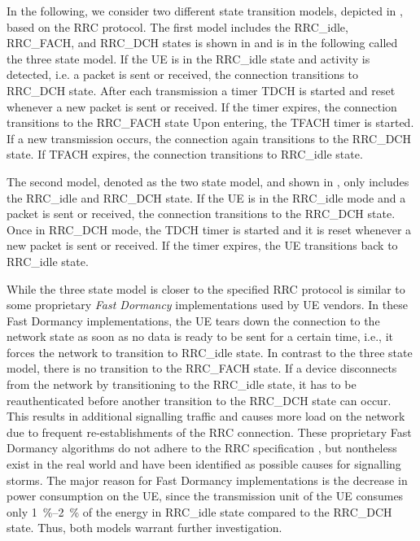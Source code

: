 In the following, we consider two different state transition models, depicted in , based on the \gls{RRC} protocol.
The first model includes the \gls{RRC_idle}, \gls{RRC_FACH}, and \gls{RRC_DCH} states is shown in  and is in the following called the three state model.
If the \gls{UE} is in the \gls{RRC_idle} state and activity is detected, i.e. a packet is sent or received, the connection transitions to \gls{RRC_DCH} state.
After each transmission a timer \gls{TDCH} is started and reset whenever a new packet is sent or received.
If the timer expires, the connection transitions to the \gls{RRC_FACH} state
Upon entering, the \gls{TFACH} timer is started.
If a new transmission occurs, the connection again transitions to the \gls{RRC_DCH} state.
If \gls{TFACH} expires, the connection transitions to \gls{RRC_idle} state.

The second model, denoted as the two state model, and shown in , only includes the \gls{RRC_idle} and \gls{RRC_DCH} state.
If the \gls{UE} is in the \gls{RRC_idle} mode and a packet is sent or received, the connection transitions to the \gls{RRC_DCH} state. Once in \gls{RRC_DCH} mode, the \gls{TDCH} timer is started and it is reset whenever a new packet is sent or received.
If the timer expires, the \gls{UE} transitions back to \gls{RRC_idle} state.

While the three state model is closer to the specified \gls{RRC} protocol is similar to some proprietary \emph{Fast Dormancy} implementations used by \gls{UE} vendors.
In these Fast Dormancy implementations, the \gls{UE} tears down the connection to the network state as soon as no data is ready to be sent for a certain time, i.e., it forces the network to transition to \gls{RRC_idle} state.
In contrast to the three state model, there is no transition to the \gls{RRC_FACH} state.
If a device disconnects from the network by transitioning to the \gls{RRC_idle} state, it has to be reauthenticated before another transition to the \gls{RRC_DCH} state can occur.
This results in additional signalling traffic and causes more load on the network \cite{NSN2011} due to frequent re-establishments of the RRC connection.
These proprietary Fast Dormancy algorithms do not adhere to the \gls{RRC} specification \cite{GSM2010}, but nontheless exist in the real world and have been identified as possible causes for signalling storms.
The major reason for Fast Dormancy implementations is the decrease in power consumption on the \gls{UE}, since the transmission unit of the \gls{UE} consumes only \SIrange{1}{2}{\percent} of the energy in \gls{RRC_idle} state compared to the \gls{RRC_DCH} state.
Thus, both models warrant further investigation.


